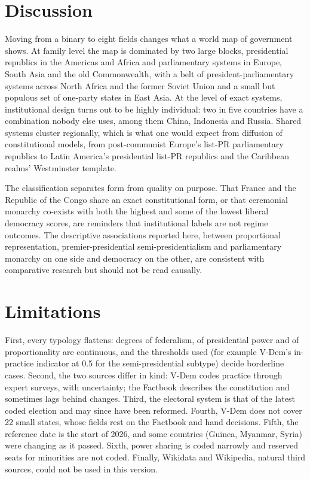 \documentclass[11pt,a4paper]{article}
\begin{document}
\section{Discussion}
Moving from a binary to eight fields changes what a world map of government shows. At family level the map is dominated by two large blocks, presidential republics in the Americas and Africa and parliamentary systems in Europe, South Asia and the old Commonwealth, with a belt of president-parliamentary systems across North Africa and the former Soviet Union and a small but populous set of one-party states in East Asia. At the level of exact systems, institutional design turns out to be highly individual: two in five countries have a combination nobody else uses, among them China, Indonesia and Russia. Shared systems cluster regionally, which is what one would expect from diffusion of constitutional models, from post-communist Europe's list-PR parliamentary republics to Latin America's presidential list-PR republics and the Caribbean realms' Westminster template.

The classification separates form from quality on purpose. That France and the Republic of the Congo share an exact constitutional form, or that ceremonial monarchy co-exists with both the highest and some of the lowest liberal democracy scores, are reminders that institutional labels are not regime outcomes. The descriptive associations reported here, between proportional representation, premier-presidential semi-presidentialism and parliamentary monarchy on one side and democracy on the other, are consistent with comparative research but should not be read causally.

\section{Limitations}
First, every typology flattens: degrees of federalism, of presidential power and of proportionality are continuous, and the thresholds used (for example V-Dem's in-practice indicator at 0.5 for the semi-presidential subtype) decide borderline cases. Second, the two sources differ in kind: V-Dem codes practice through expert surveys, with uncertainty; the Factbook describes the constitution and sometimes lags behind changes. Third, the electoral system is that of the latest coded election and may since have been reformed. Fourth, V-Dem does not cover 22 small states, whose fields rest on the Factbook and hand decisions. Fifth, the reference date is the start of 2026, and some countries (Guinea, Myanmar, Syria) were changing as it passed. Sixth, power sharing is coded narrowly and reserved seats for minorities are not coded. Finally, Wikidata and Wikipedia, natural third sources, could not be used in this version.
\end{document}
